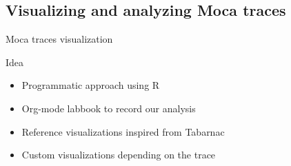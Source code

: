 \documentclass[xcolor={usenames,dvipsnames},hyperref={pdfusetitle}]{beamer}
\begin{document}
\subsection*{Visualizing and analyzing Moca traces}

\begin{frame}{Moca traces visualization}
    \begin{block}{Idea}
        \begin{itemize}
            \item Programmatic approach using R
            \item Org-mode labbook to record our analysis
            \item Reference visualizations inspired from Tabarnac
            \item Custom visualizations depending on the trace
        \end{itemize}
    \end{block}
\end{frame}
\end{document}
